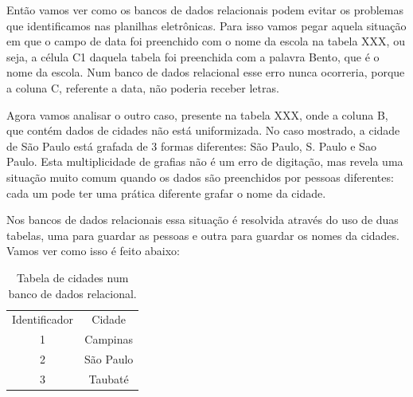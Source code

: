 \documentclass[
12pt,		%
openright,	%
twoside,  %
a4paper,			%
chapter=TITLE,		%
english,			%
french,				%
spanish,			%
brazil				%
]{USPSC-classe/USPSC}
\begin{document}
Ent\~ao vamos ver como os bancos de dados relacionais podem evitar os problemas que identificamos nas planilhas eletr\^onicas. Para isso vamos pegar aquela situa\c{c}\~ao em que o campo de data foi preenchido com o nome da escola na tabela XXX, ou seja, a c\'elula C1 daquela tabela foi preenchida com a palavra \textquotedbl Bento\textquotedbl , que \'e o nome da escola. Num banco de dados relacional esse erro nunca ocorreria, porque a coluna C, referente a data, n\~ao poderia receber letras.

















Agora vamos analisar o outro caso, presente na tabela XXX, onde a coluna B, que cont\'em dados de cidades n\~ao est\'a uniformizada. No caso mostrado, a cidade de S\~ao Paulo est\'a grafada de 3 formas diferentes: S\~ao Paulo, S. Paulo e Sao Paulo. Esta multiplicidade de grafias n\~ao \'e um erro de digita\c{c}\~ao, mas revela uma situa\c{c}\~ao muito comum quando os dados s\~ao preenchidos por pessoas diferentes: cada um pode ter uma pr\'atica diferente grafar o nome da cidade.

















Nos bancos de dados relacionais essa situa\c{c}\~ao \'e resolvida atrav\'es do uso de duas tabelas, uma para guardar as pessoas e outra para guardar os nomes da cidades. Vamos ver como isso \'e feito abaixo:





















\begin{table}[htb]
\tiny
\caption{\label{e4d91173469576e32f3571663aaeb94e34415b3e}Tabela de cidades num banco de dados relacional.}

\centering
\begin{tabular}{|c|c|}
\hline
Identificador  &  Cidade \\
1  &  Campinas \\
2  &  S\~ao Paulo \\
3  &  Taubat\'e \\
\hline
\end{tabular}
\end{table}
\end{document}
